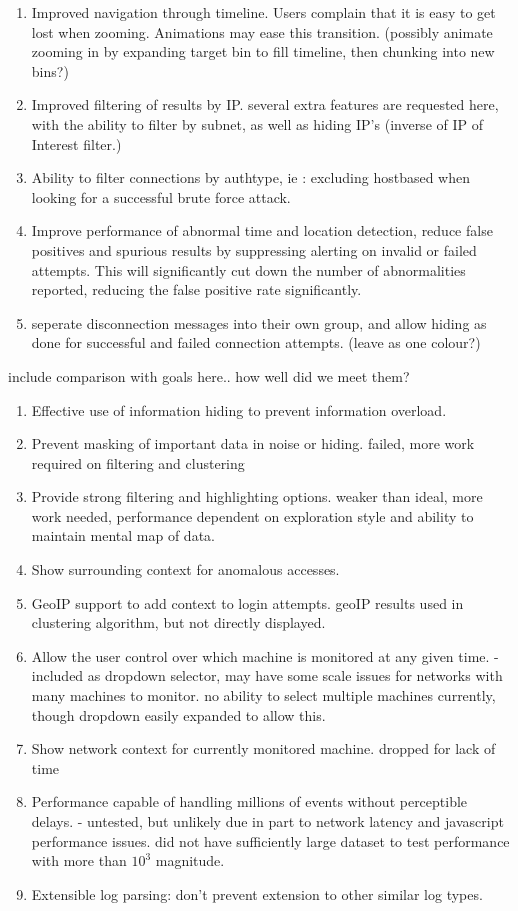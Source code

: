 \begin{enumerate}
\item{Improved navigation through timeline. Users complain that it is easy to get lost when zooming. Animations may ease this transition. (possibly animate zooming in by expanding target bin to fill timeline, then chunking into new bins?)}
\item{Improved filtering of results by IP. several extra features are requested here, with the ability to filter by subnet, as well as hiding IP's (inverse of IP of Interest filter.)}
\item{Ability to filter connections by authtype, ie : excluding hostbased when looking for a successful brute force attack.}
\item{Improve performance of abnormal time and location detection, reduce false positives and spurious results by suppressing alerting on invalid or failed attempts. This will significantly cut down the number of abnormalities reported, reducing the false positive rate significantly.}
\item{seperate disconnection messages into their own group, and allow hiding as done for successful and failed connection attempts. (leave as one colour?)}
\end{enumerate}

include comparison with goals here.. how well did we meet them?
\begin{enumerate}
\item{Effective use of information hiding to prevent information overload.}
\item{Prevent masking of important data in noise or hiding. failed, more work required on filtering and clustering}
\item{Provide strong filtering and highlighting options. weaker than ideal, more work needed, performance dependent on exploration style and ability to maintain mental map of data.}
\item{Show surrounding context for anomalous accesses.}
\item{GeoIP support to add context to login attempts. geoIP results used in clustering algorithm, but not directly displayed.}
\item{Allow the user control over which machine is monitored at any given time. -included as dropdown selector, may have some scale issues for networks with many machines to monitor. no ability to select multiple machines currently, though dropdown easily expanded to allow this.}
\item{Show network context for currently monitored machine. dropped for lack of time}
\item{Performance capable of handling millions of events without perceptible delays. - untested, but unlikely due in part to network latency and javascript performance issues. did not have sufficiently large dataset to test performance with more than $10^3$ magnitude.}
\item{Extensible log parsing: don't prevent extension to other similar log types.}
\end{enumerate}


